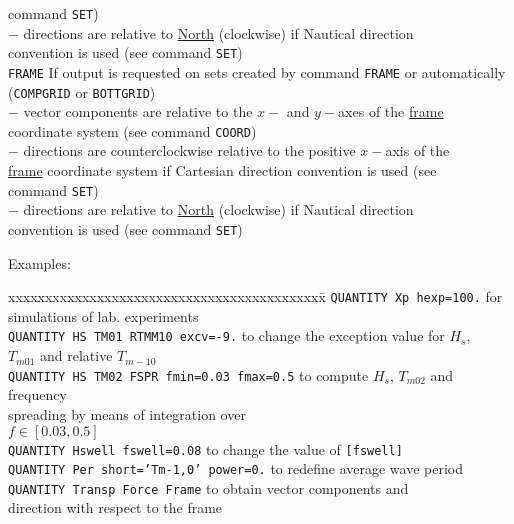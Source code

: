 \documentclass[12pt]{book}
\begin{document}
\begin{tabbing}
                      command {\tt SET})\\
                      $-$ directions  are relative to \underline{North} (clockwise) if Nautical direction\\
                      convention is used (see command {\tt SET})\-\\
{\tt FRAME}        \> If output is requested on sets created by command {\tt FRAME} or automatically\+\\
                      ({\tt COMPGRID} or {\tt BOTTGRID})\\
                      $-$ vector components are relative to the $x-$ and $y-$axes of the \underline{frame}\\
                      coordinate system (see command {\tt COORD})\\
                      $-$ directions are counterclockwise relative to the positive $x-$axis of the\\
                      \underline{frame} coordinate system if Cartesian direction convention is used (see\\
                      command {\tt SET})\\
                      $-$ directions  are relative to \underline{North} (clockwise) if Nautical direction\\
                      convention is used (see command {\tt SET})\-\\
\end{tabbing}

\noindent
Examples:
\begin{tabbing}
 xxxxxxxxxxxxxxxxxxxxxxxxxxxxxxxxxxxxxxxxxxx\= \kill
{\tt QUANTITY Xp hexp=100.}                    \> for simulations of lab. experiments\\
{\tt QUANTITY HS TM01 RTMM10 excv=-9.}         \> to change the exception value for $H_s$,\+\\
                                                  $T_{m01}$ and relative $T_{m-10}$\-\\
{\tt QUANTITY HS TM02 FSPR fmin=0.03 fmax=0.5} \> to compute $H_s$, $T_{m02}$ and frequency\+\\
                                                  spreading by means of integration over\\
                                                  $f \in [0.03, 0.5]$\-\\
{\tt QUANTITY Hswell fswell=0.08}              \> to change the value of {\tt [fswell]}\\
{\tt QUANTITY Per short='Tm-1,0'  power=0.}    \> to redefine average wave period\\
{\tt QUANTITY Transp Force Frame}              \> to obtain vector components and\+\\
                                                  direction with respect to the frame\-\\
\end{tabbing}
\end{document}
